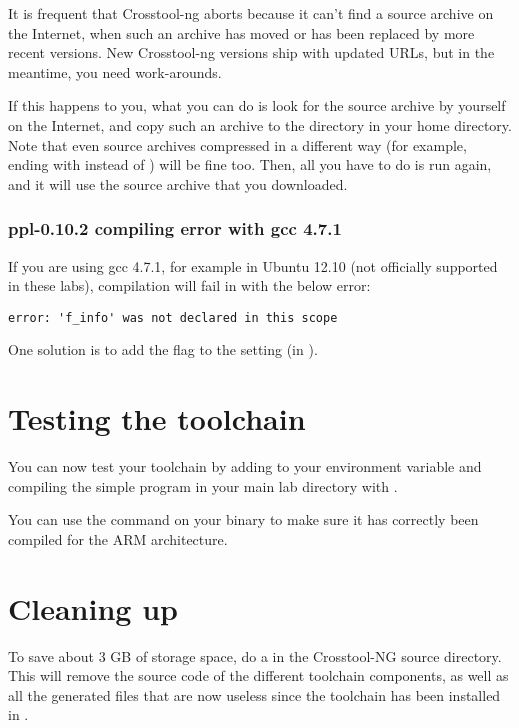 It is frequent that Crosstool-ng aborts because it can't find a
source archive on the Internet, when such an archive has moved or has
been replaced by more recent versions. New Crosstool-ng versions ship
with updated URLs, but in the meantime, you need work-arounds.

If this happens to you, what you can do is look for the source archive by
yourself on the Internet, and copy such an archive to the 
directory in your home directory. Note that even source archives
compressed in a different way (for example, ending with 
instead of ) will be fine too. Then, all you have to do is run
 again, and it will use the source archive that you
downloaded.

\subsubsection{ppl-0.10.2 compiling error with gcc 4.7.1}

If you are using gcc 4.7.1, for example in Ubuntu 12.10 (not officially
supported in these labs), compilation will fail in  with
the below error:

\begin{verbatim}
error: 'f_info' was not declared in this scope
\end{verbatim}

One solution is to add the  flag to the
 setting (in ). 

\section{Testing the toolchain}

You can now test your toolchain by adding
 to your
 environment variable and compiling the simple
 program in your main lab directory with
.

You can use the  command on your binary to make sure it has
correctly been compiled for the ARM architecture.

\section{Cleaning up}

To save about 3 GB of storage space, do a  in the
Crosstool-NG source directory. This will remove the source code of the
different toolchain components, as well as all the generated files
that are now useless since the toolchain has been installed in
.
